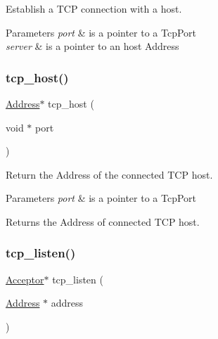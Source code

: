 Establish a T\+CP connection with a host. 


\begin{DoxyParams}{Parameters}
{\em port} & is a pointer to a Tcp\+Port \\
\hline
{\em server} & is a pointer to an host Address \\
\hline
\end{DoxyParams}
\mbox{\label{group__tcp_gafcf36036563f4bf40b5ec38752b29391}} 
\subsubsection{\texorpdfstring{tcp\+\_\+host()}{tcp\_host()}}
{\footnotesize\ttfamily \hyperlink{group__address_ga80f2dcdb3778441e85ac8c9dbb6f324a}{Address}$\ast$ tcp\+\_\+host (\begin{DoxyParamCaption}\item[{void $\ast$}]{port }\end{DoxyParamCaption})}



Return the Address of the connected T\+CP host. 


\begin{DoxyParams}{Parameters}
{\em port} & is a pointer to a Tcp\+Port \\
\hline
\end{DoxyParams}
\begin{DoxyReturn}{Returns}
the Address of connected T\+CP host. 
\end{DoxyReturn}
\mbox{\label{group__tcp_ga2dacd5771bd75f786c01c9fb13967a18}} 
\subsubsection{\texorpdfstring{tcp\+\_\+listen()}{tcp\_listen()}}
{\footnotesize\ttfamily \hyperlink{group__tcp_ga99fb3ed761c86c0379dc50f80c51c87a}{Acceptor}$\ast$ tcp\+\_\+listen (\begin{DoxyParamCaption}\item[{\hyperlink{group__address_ga80f2dcdb3778441e85ac8c9dbb6f324a}{Address} $\ast$}]{address }\end{DoxyParamCaption})}



